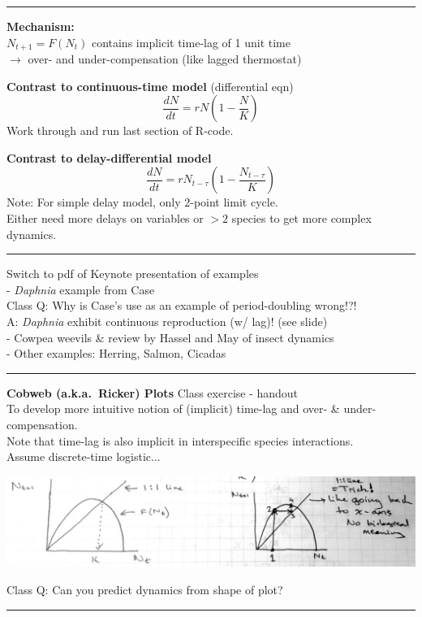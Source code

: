 \documentclass{article}
\newcommand{\note}[1]{\colorbox{gray!30}{#1}}
\newcommand{\ind}{\-\hspace{1cm}}
\begin{document}
\rule[0.5ex]{\linewidth}{1pt}
\pagebreak

\textbf{Mechanism:}\\
$N_{t+1} = F(N_t)$ contains implicit time-lag of 1 unit time\\
\ind $\to$ over- and under-compensation (like lagged thermostat)

\textbf{Contrast to continuous-time model} (differential eqn)\\
\begin{equation*}
	\frac{dN}{dt}=rN\left(1-\frac{N}{K}\right)
\end{equation*}
\note{Work through and run last section of R-code.}

\textbf{Contrast to delay-differential model}
\begin{equation*}
	\frac{dN}{dt}=rN_{t-\tau}\left(1-\frac{N_{t-\tau}}{K}\right)
\end{equation*}
Note: For simple delay model, only 2-point limit cycle.  \\
\ind  Either need more delays on variables or $>2$ species to get more complex dynamics.

\rule[0.5ex]{\linewidth}{1pt}

\note{Switch to pdf of Keynote presentation of examples}\\
\ind - \emph{Daphnia} example from Case\\
\ind \ind \note{Class Q:} Why is Case's use as an example of period-doubling wrong!?!\\
\ind \ind \note{A:} \emph{Daphnia} exhibit continuous reproduction (w/ lag)! (see slide)\\
\ind - Cowpea weevils \& review by Hassel and May of insect dynamics\\
\ind - Other examples: Herring, Salmon, Cicadas\\

\rule[0.5ex]{\linewidth}{1pt}

\textbf{Cobweb (a.k.a.~Ricker) Plots} \note{Class exercise - handout}\\
To develop more intuitive notion of (implicit) time-lag and over- \& under-compensation.\\
Note that time-lag is also implicit in interspecific species interactions.\\
Assume discrete-time logistic...

\begin{center}
	\includegraphics[width=16cm]{figs/RickerCurve.pdf}
\end{center}

\note{Class Q:} Can you predict dynamics from shape of plot?\\

\rule[0.5ex]{\linewidth}{1pt}
\end{document}
